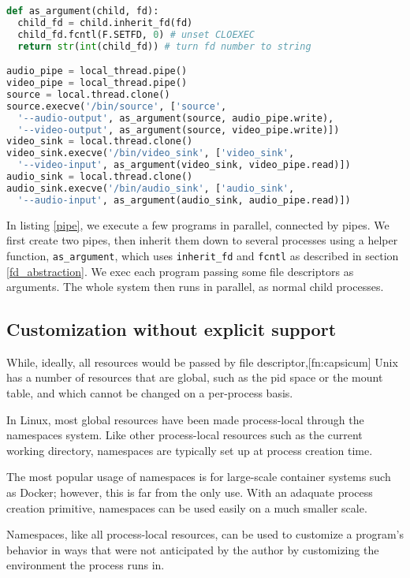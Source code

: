 \documentclass[sigplan]{acmart}
\begin{document}
\begin{lstlisting}[float=*,language=Python,label={pipe},caption={Creating a parallel processing pipeline}]
def as_argument(child, fd):
  child_fd = child.inherit_fd(fd)
  child_fd.fcntl(F.SETFD, 0) # unset CLOEXEC
  return str(int(child_fd)) # turn fd number to string

audio_pipe = local_thread.pipe()
video_pipe = local_thread.pipe()
source = local.thread.clone()
source.execve('/bin/source', ['source',
  '--audio-output', as_argument(source, audio_pipe.write),
  '--video-output', as_argument(source, video_pipe.write)])
video_sink = local.thread.clone()
video_sink.execve('/bin/video_sink', ['video_sink',
  '--video-input', as_argument(video_sink, video_pipe.read)])
audio_sink = local.thread.clone()
audio_sink.execve('/bin/audio_sink', ['audio_sink',
  '--audio-input', as_argument(audio_sink, audio_pipe.read)])
\end{lstlisting}
In listing \ref{pipe},
we execute a few programs in parallel,
connected by pipes.
We first create two pipes,
then inherit them down to several processes using a helper function, \verb|as_argument|,
which uses \verb|inherit_fd| and \texttt{fcntl} as described in section \ref{fd_abstraction}.
We exec each program passing some file descriptors as arguments.
The whole system then runs in parallel,
as normal child processes.
\subsection{Customization without explicit support}
While, ideally, all resources would be passed by file descriptor,[fn:capsicum]
Unix has a number of resources that are global,
such as the pid space or the mount table,
and which cannot be changed on a per-process basis.

In Linux, most global resources have been made process-local
through the namespaces system.
Like other process-local resources such as the current working directory,
namespaces are typically set up at process creation time.

The most popular usage of namespaces is for large-scale container systems such as Docker;
however, this is far from the only use.
With an adaquate process creation primitive,
namespaces can be used easily on a much smaller scale.

Namespaces, like all process-local resources,
can be used to customize a program's behavior
in ways that were not anticipated by the author
by customizing the environment the process runs in.
\end{document}
